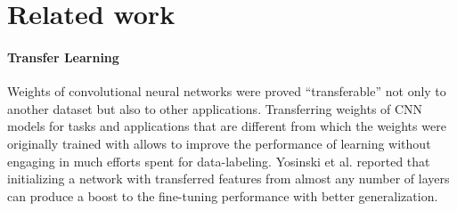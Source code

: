 \section{Related work}
\label{sec:related}

%



\paragraph{Transfer Learning}

Weights of convolutional neural networks were proved ``transferable'' not only to another dataset\cite{shin2016deep,yosinski2014transferable} but also to other applications\cite{girshick2014rich,long2015fully}.
Transferring weights of CNN models for tasks and applications that are different from which the weights were originally trained with allows to improve the performance of learning without engaging in much efforts spent for data-labeling.\cite{pan2010survey}
Yosinski et al.\cite{yosinski2014transferable} reported that initializing a network with transferred features from almost any number of layers can produce a boost to the fine-tuning performance with better generalization.


